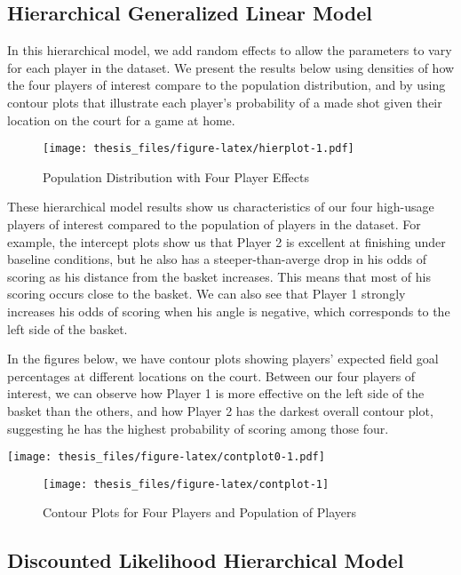 \documentclass[12pt,twoside]{dukestatscithesis}
\theoremstyle{definition}
\theoremstyle{definition}
\theoremstyle{definition}
\theoremstyle{remark}
\begin{document}
\subsection{Hierarchical Generalized Linear
Model}\label{hierarchical-generalized-linear-model-1}

In this hierarchical model, we add random effects to allow the
parameters to vary for each player in the dataset. We present the
results below using densities of how the four players of interest
compare to the population distribution, and by using contour plots that
illustrate each player's probability of a made shot given their location
on the court for a game at home.
\begin{figure}[htbp]
\centering
\texttt{[image: thesis\_files/figure-latex/hierplot-1.pdf]}
\caption{\label{fig:hierplot}Population Distribution with Four Player
Effects}
\end{figure}
These hierarchical model results show us characteristics of our four
high-usage players of interest compared to the population of players in
the dataset. For example, the intercept plots show us that Player 2 is
excellent at finishing under baseline conditions, but he also has a
steeper-than-averge drop in his odds of scoring as his distance from the
basket increases. This means that most of his scoring occurs close to
the basket. We can also see that Player 1 strongly increases his odds of
scoring when his angle is negative, which corresponds to the left side
of the basket.

In the figures below, we have contour plots showing players' expected
field goal percentages at different locations on the court. Between our
four players of interest, we can observe how Player 1 is more effective
on the left side of the basket than the others, and how Player 2 has the
darkest overall contour plot, suggesting he has the highest probability
of scoring among those four.

\texttt{[image: thesis\_files/figure-latex/contplot0-1.pdf]}
\begin{figure}

\hfill{}\texttt{[image: thesis\_files/figure-latex/contplot-1]} 

\caption{Contour Plots for Four Players and Population of Players}\label{fig:contplot}
\end{figure}
\subsection{Discounted Likelihood Hierarchical
Model}\label{discounted-likelihood-hierarchical-model-1}
\end{document}
